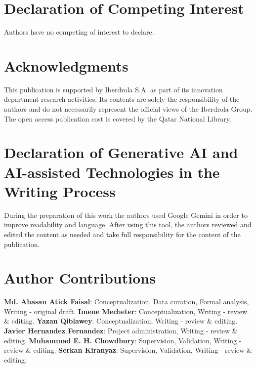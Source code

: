 \section*{Declaration of Competing Interest}
Authors have no competing of interest to declare.

\section*{Acknowledgments}
This publication is supported by Iberdrola S.A. as part of its innovation department research activities. Its contents are solely the responsibility of the authors and do not necessarily represent the official views of the Iberdrola Group. The open access publication cost is covered by the Qatar National Library.

\section*{Declaration of Generative AI and AI-assisted Technologies in the Writing Process}
During the preparation of this work the authors used Google Gemini in order to improve readability and language. After using this tool, the authors reviewed and edited the content as needed and take full responsibility for the content of the publication.

\section*{Author Contributions}
\textbf{Md. Ahasan Atick Faisal}: Conceptualization, Data curation, Formal analysis, Writing - original draft. \textbf{Imene Mecheter}: Conceptualization, Writing - review \& editing. \textbf{Yazan Qiblawey}: Conceptualization, Writing - review \& editing. \textbf{Javier Hernandez Fernandez}: Project administration, Writing - review \& editing. \textbf{Muhammad E. H. Chowdhury}: Supervision, Validation, Writing - review \& editing. \textbf{Serkan Kiranyaz}: Supervision, Validation, Writing - review \& editing. 
